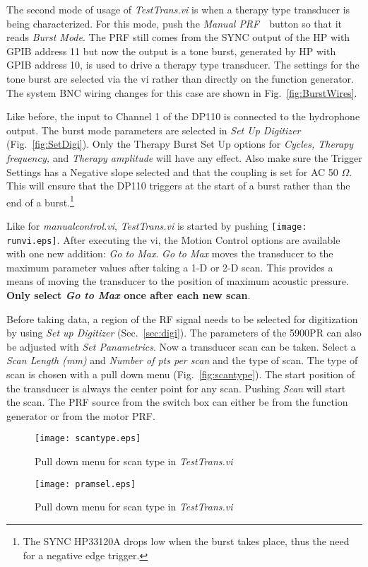 \documentclass[10pt]{article}
\begin{document}
The second mode of usage of {\it TestTrans.vi} is when a therapy
type transducer is being characterized. For this mode, push the
{\it Manual PRF}~\ button so that it reads {\it Burst Mode}. The
PRF still comes from the SYNC output of the HP with GPIB address
11 but now the output is a tone burst, generated by HP with GPIB
address 10, is used to drive a therapy type transducer. The
settings for the tone burst are selected via the vi rather than
directly on the function generator. The system BNC wiring changes
for this case are shown in Fig.~\ref{fig:BurstWires}.

Like before, the input to Channel 1 of the DP110 is connected to
the hydrophone output. The burst mode parameters are selected in
{\it Set Up Digitizer} (Fig.~\ref{fig:SetDigi}). Only the Therapy
Burst Set Up options for {\it Cycles, Therapy frequency,} and {\it
Therapy amplitude} will have any effect. Also make sure the
Trigger Settings has a Negative slope selected and that the
coupling is set for AC 50 $\Omega$. This will ensure that the
DP110 triggers at the start of a burst rather than the end of a
burst.\footnote{The SYNC HP33120A drops low when the burst takes
place, thus the need for a negative edge trigger.}

Like for {\it manualcontrol.vi}, {\it TestTrans.vi} is started by
pushing \texttt{[image: runvi.eps]}. After executing the vi, the
Motion Control options are available with one new addition: {\it
Go to Max}. {\it Go to Max} moves the transducer to the maximum
parameter values after taking a 1-D or 2-D scan. This provides a
means of moving the transducer to the position of maximum acoustic
pressure. {\bf Only select {\it Go to Max} once after each new
scan}.

Before taking data, a region of the RF signal needs to be selected
for digitization by using {\it Set up Digitizer}
(Sec.~\ref{sec:digi}). The parameters of the 5900PR can also be
adjusted with {\it Set Panametrics}. Now a transducer scan can be
taken. Select a {\it Scan Length (mm)} and {\it Number of pts per
scan} and the type of scan. The type of scan is chosen with a pull
down menu (Fig.~\ref{fig:scantype}). The start position of the
transducer is always the center point for any scan. Pushing {\it
Scan} will start the scan. The PRF source from the switch box can
either be from the function generator or from the motor PRF.

\begin{figure}
\begin{minipage}[t]{.45\textwidth}
\begin{center}
\texttt{[image: scantype.eps]}
 \caption{Pull down menu for scan type in {\it TestTrans.vi}}
 \label{fig:scantype}
\end{center}
\end{minipage}
\hspace{1 cm}
\begin{minipage}[t]{.45\textwidth}
\begin{center}
\texttt{[image: pramsel.eps]}
 \caption{Pull down menu for scan type in {\it TestTrans.vi}}
 \label{fig:pramsel}
\end{center}
\end{minipage}
\end{figure}
\end{document}
